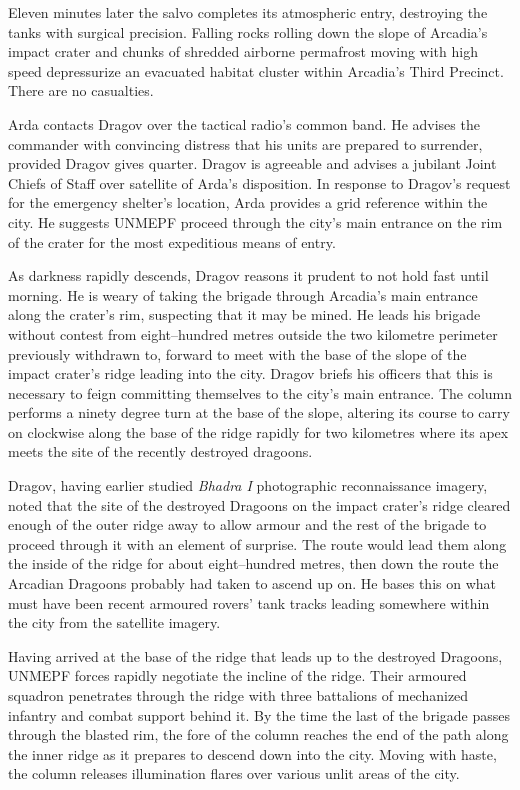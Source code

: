 Eleven minutes later the salvo completes its atmospheric entry, destroying the tanks with surgical precision. Falling rocks rolling down the slope of Arcadia's impact crater and chunks of shredded airborne permafrost moving with high speed depressurize an evacuated habitat cluster within Arcadia's Third Precinct. There are no casualties.

Arda contacts Dragov over the tactical radio's common band. He advises the commander with convincing distress that his units are prepared to surrender, provided Dragov gives quarter. Dragov is agreeable and advises a jubilant Joint Chiefs of Staff over satellite of Arda's disposition. In response to Dragov's request for the emergency shelter's location, Arda provides a grid reference within the city. He suggests UNMEPF proceed through the city's main entrance on the rim of the crater for the most expeditious means of entry.

As darkness rapidly descends, Dragov reasons it prudent to not hold fast until morning. He is weary of taking the brigade through Arcadia's main entrance along the crater's rim, suspecting that it may be mined. He leads his brigade without contest from eight--hundred metres outside the two kilometre perimeter previously withdrawn to, forward to meet with the base of the slope of the impact crater's ridge leading into the city. Dragov briefs his officers that this is necessary to feign committing themselves to the city's main entrance. The column performs a ninety degree turn at the base of the slope, altering its course to carry on clockwise along the base of the ridge rapidly for two kilometres where its apex meets the site of the recently destroyed dragoons.

Dragov, having earlier studied {\it Bhadra I} photographic reconnaissance imagery, noted that the site of the destroyed Dragoons on the impact crater's ridge cleared enough of the outer ridge away to allow armour and the rest of the brigade to proceed through it with an element of surprise. The route would lead them along the inside of the ridge for about eight--hundred metres, then down the route the Arcadian Dragoons probably had taken to ascend up on. He bases this on what must have been recent armoured rovers' tank tracks leading somewhere within the city from the satellite imagery.

Having arrived at the base of the ridge that leads up to the destroyed Dragoons, UNMEPF forces rapidly negotiate the incline of the ridge. Their armoured squadron penetrates through the ridge with three battalions of mechanized infantry and combat support behind it. By the time the last of the brigade passes through the blasted rim, the fore of the column reaches the end of the path along the inner ridge as it prepares to descend down into the city. Moving with haste, the column releases illumination flares over various unlit areas of the city. 

